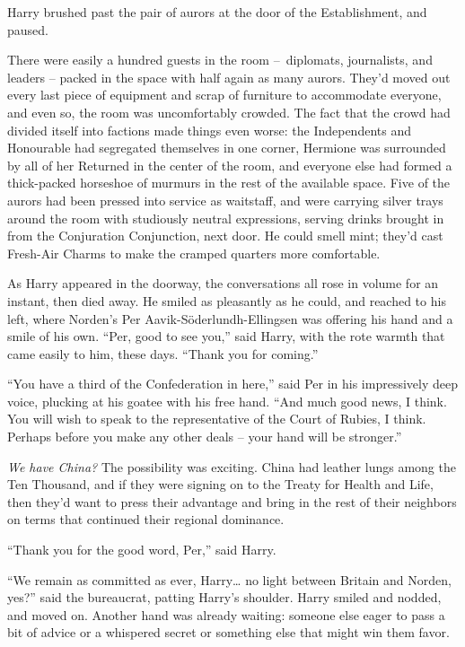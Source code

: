 Harry brushed past the pair of aurors at the door of the Establishment,
and paused.

There were easily a hundred guests in the room --~diplomats,
journalists, and leaders -- packed in the space with half again as many
aurors. They'd moved out every last piece of equipment and scrap of
furniture to accommodate everyone, and even so, the room was
uncomfortably crowded. The fact that the crowd had divided itself into
factions made things even worse: the Independents and Honourable had
segregated themselves in one corner, Hermione was surrounded by all of
her Returned in the center of the room, and everyone else had formed a
thick-packed horseshoe of murmurs in the rest of the available space.
Five of the aurors had been pressed into service as waitstaff, and were
carrying silver trays around the room with studiously neutral
expressions, serving drinks brought in from the Conjuration Conjunction,
next door. He could smell mint; they'd cast Fresh-Air Charms to make the
cramped quarters more comfortable.

As Harry appeared in the doorway, the conversations all rose in volume
for an instant, then died away. He smiled as pleasantly as he could, and
reached to his left, where Norden's Per Aavik-Söderlundh-Ellingsen was
offering his hand and a smile of his own. ``Per, good to see you,'' said
Harry, with the rote warmth that came easily to him, these days. ``Thank
you for coming.''

``You have a third of the Confederation in here,'' said Per in his
impressively deep voice, plucking at his goatee with his free hand.
``And much good news, I think. You will wish to speak to the
representative of the Court of Rubies, I think. Perhaps before you make
any other deals -- your hand will be stronger.''

\emph{We have China?} The possibility was exciting. China had leather
lungs among the Ten Thousand, and if they were signing on to the Treaty
for Health and Life, then they'd want to press their advantage and bring
in the rest of their neighbors on terms that continued their regional
dominance.

``Thank you for the good word, Per,'' said Harry.

``We remain as committed as ever, Harry\ldots{} no light between Britain
and Norden, yes?'' said the bureaucrat, patting Harry's shoulder. Harry
smiled and nodded, and moved on. Another hand was already waiting:
someone else eager to pass a bit of advice or a whispered secret or
something else that might win them favor.


